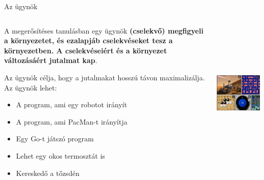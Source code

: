 \documentclass[english, aspectratio=169]{beamer}
\begin{document}
\begin{frame}{Az ügynök}
\begin{columns}
\begin{column}{.5\textwidth}
A megerősítéses tanulásban egy ügynök \textbf{(cselekvő) megfigyeli a környezetet, és ezalapjáb cselekvéseket tesz a környezetben. A cselekvéseiért és a környezet változásáért jutalmat kap}.\par\smallskip
Az ügynök célja, hogy a jutalmakat hosszú távon maximalizálja. Az ügynök lehet:
\begin{itemize}
	\item A program, ami egy robotot irányít
	\item A program, ami PacMan-t irányítja
	\item Egy Go-t játszó program
	\item Lehet egy okos termosztát is
	\item Kereskedő a tőzsdén
\end{itemize}
\end{column}
\begin{column}{.5\textwidth}
\begin{center}
\includegraphics[width=7cm, height=7cm, keepaspectratio]{images/reinforcement_8.png}
\end{center}
\end{column}
\end{columns}
\end{frame}
\end{document}
